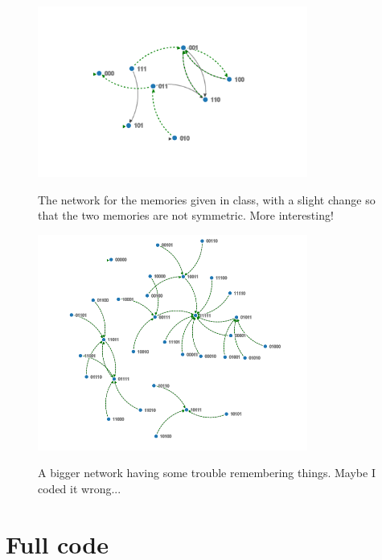 \documentclass{article}
\begin{document}
\begin{figure}[h!]
 \centering
  \includegraphics[width=0.79\textwidth]{network2.png}
  \label{fig:2}
  \caption{The network for the memories given in class, with a slight change so that the two memories are not symmetric. More interesting!}
\end{figure}

\begin{figure}[h!]
 \centering
  \includegraphics[width=0.79\textwidth]{network3.png}
  \label{fig:2}
  \caption{A bigger network having some trouble remembering things. Maybe I coded it wrong...}
\end{figure}

\clearpage
\pagebreak

\section*{Full code}



\clearpage
\pagebreak


\end{document}
